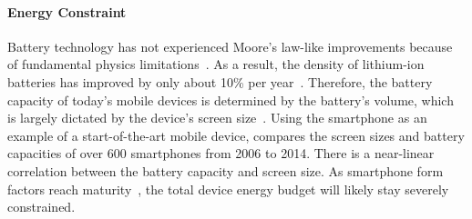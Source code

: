 \paragraph{Energy Constraint} Battery technology has not experienced Moore's law-like improvements because of fundamental physics limitations~\cite{battery-mooreslaw}. As a result, the density of lithium-ion batteries has improved by only about 10\% per year~\cite{battery-stats}.  Therefore, the battery capacity of today's mobile devices is determined by the battery's volume, which is largely dictated by the device's screen size~\cite{phonescreen}. Using the smartphone as an example of a start-of-the-art mobile device,  compares the screen sizes and battery capacities of over 600 smartphones from 2006 to 2014. There is a near-linear correlation between the battery capacity and screen size. As smartphone form factors reach maturity~\cite{phonesize}, the total device energy budget will likely stay severely constrained.

